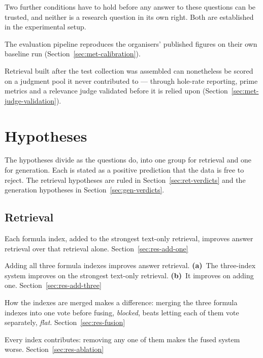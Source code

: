 Two further conditions have to hold before any answer to these questions can be trusted, and
neither is a research question in its own right. Both are established in the experimental setup.

\begin{description}[leftmargin=3.2em,style=nextline]
  \item[\textbf{P1}] The evaluation pipeline reproduces the organisers' published figures on their
    own baseline run (Section~\ref{sec:met-calibration}).
  \item[\textbf{P2}] Retrieval built after the test collection was assembled can nonetheless be
    scored on a judgment pool it never contributed to --- through hole-rate reporting, prime
    metrics and a relevance judge validated before it is relied upon
    (Section~\ref{sec:met-judge-validation}).
\end{description}

\section{Hypotheses}\label{sec:intro-hypotheses}

The hypotheses divide as the questions do, into one group for retrieval and one for generation.
Each is stated as a positive prediction that the data is free to reject. The retrieval hypotheses
are ruled in Section~\ref{sec:ret-verdicts} and the generation hypotheses in
Section~\ref{sec:gen-verdicts}.

\subsection*{Retrieval}

\begin{description}[leftmargin=3.2em,style=nextline]
  \item[\textbf{H1.1} (RQ1.1)] Each formula index, added to the strongest text-only retrieval,
    improves answer retrieval over that retrieval alone.
    \hfill Section~\ref{sec:res-add-one}
  \item[\textbf{H1.2} (RQ1.2)] Adding all three formula indexes improves answer retrieval.
    \textbf{(a)}~The three-index system improves on the strongest text-only retrieval.
    \textbf{(b)}~It improves on adding one.
    \hfill Section~\ref{sec:res-add-three}
  \item[\textbf{H1.3} (RQ1.2)] How the indexes are merged makes a difference: merging the three
    formula indexes into one vote before fusing, \emph{blocked}, beats letting each of them vote
    separately, \emph{flat}.
    \hfill Section~\ref{sec:res-fusion}
  \item[\textbf{H1.4} (RQ1.2)] Every index contributes: removing any one of them makes the fused
    system worse.
    \hfill Section~\ref{sec:res-ablation}
\end{description}

